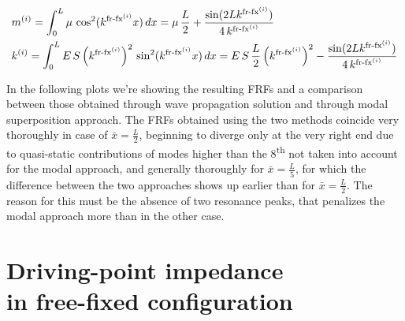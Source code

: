 \documentclass[a4paper,12pt,oneside]{article}
\begin{document}
\[ \begin{split}
	& m^{(i)} = \int_0^L \mu \, \cos^2(k^{\textup{fr-fx}^{(i)}} x) \, dx =
		\mu \, \frac{L}{2} + \frac{\sin(2 L k^{\textup{fr-fx}^{(i)}})}
		{4 \, k^{\textup{fr-fx}^{(i)}}} \\
	& k^{(i)} = \int_0^L E \, S \, \Bigl(k^{\textup{fr-fx}^{(i)}}\Bigr)^2 \,
		\sin^2(k^{\textup{fr-fx}^{(i)}} x) \, dx =
		E \, S \, \frac{L}{2} \, \Bigl(k^{\textup{fr-fx}^{(i)}}\Bigr)^2 -
		\frac{\sin(2 L k^{\textup{fr-fx}^{(i)}})}{4 \, k^{\textup{fr-fx}^{(i)}}}
\end{split} \]

\vspace{20pt}

In the following plots we're showing the resulting FRFs and a comparison between those obtained through wave propagation solution and through modal superposition approach. The FRFs obtained using the two methods coincide very thoroughly in case of $ \bar{x} = \frac{L}{2} $, beginning to diverge only at the very right end due to quasi-static contributions of modes higher than the 8\textsuperscript{th} not taken into account for the modal approach, and generally thoroughly for $ \bar{x} = \frac{L}{5} $, for which the difference between the two approaches shows up earlier than for $ \bar{x} = \frac{L}{2} $. The reason for this must be the absence of two resonance peaks, that penalizes the modal approach more than in the other case. %

\vspace{150pt}

\begin{figure}[h]
	\centering
	\def\svgwidth{\columnwidth}
	
\end{figure}

\clearpage

\begin{figure}[h]
	\vspace{50pt}
	\centering
	\def\svgwidth{\columnwidth}
	
\end{figure}

\vspace{30pt}


\section{Driving-point impedance \\ in free-fixed configuration}
\end{document}
